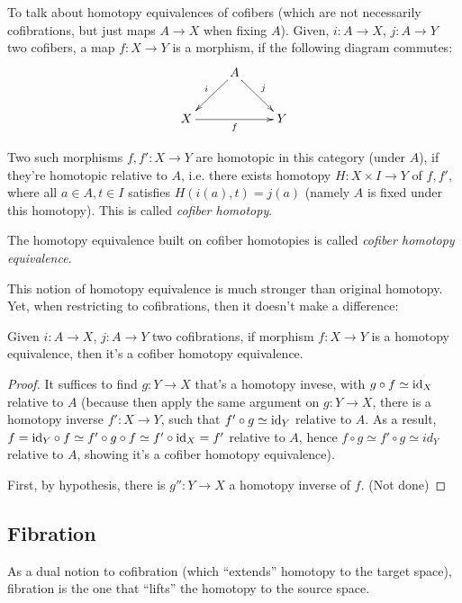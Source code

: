 \documentclass{article}
\begin{document}
\hfil

To talk about homotopy equivalences of cofibers (which are not necessarily cofibrations, but just maps $A\rightarrow X$ when fixing $A$). Given, $i:A\rightarrow X$, $j:A\rightarrow Y$ two cofibers, a map $f:X\rightarrow Y$ is a morphism, if the following diagram commutes:
\[\xymatrix{
    & A \ar[dl]_-{i} \ar[dr]^-{j}\\
    X \ar[rr]_-{f} && Y
}\]

\begin{defn}
    Two such morphisms $f,f':X\rightarrow Y$ are homotopic in this category (under $A$), if they're homotopic relative to $A$, i.e. there exists homotopy $H:X\times I\rightarrow Y$ of $f,f'$, where all $a\in A, t\in I$ satisfies $H(i(a),t)=j(a)$ (namely $A$ is fixed under this homotopy). This is called \emph{cofiber homotopy}.

    The homotopy equivalence built on cofiber homotopies is called \emph{cofiber homotopy equivalence}.
\end{defn}

This notion of homotopy equivalence is much stronger than original homotopy. Yet, when restricting to cofibrations, then it doesn't make a difference:
\begin{prop}
    Given $i:A\rightarrow X$, $j:A\rightarrow Y$ two cofibrations, if morphism $f:X\rightarrow Y$ is a homotopy equivalence, then it's a cofiber homotopy equivalence.
\end{prop}

\begin{proof}
    It suffices to find $g:Y\rightarrow X$ that's a homotopy invese, with $g\circ f\simeq \mathrm{id}_X$ relative to $A$ (because then apply the same argument on $g:Y \rightarrow X$, there is a homotopy inverse $f':X\rightarrow Y$, such that $f'\circ g\simeq \mathrm{id}_Y$ relative to $A$. As a result, $f = \mathrm{id}_Y \circ f\simeq f'\circ g\circ f\simeq f'\circ \mathrm{id}_X = f'$ relative to $A$, hence $f\circ g\simeq f'\circ g\simeq id_Y$ relative to $A$, showing it's a cofiber homotopy equivalence).

    First, by hypothesis, there is $g'':Y\rightarrow X$ a homotopy inverse of $f$. (Not done)
\end{proof}

\newpage

\subsection{Fibration}

As a dual notion to cofibration (which ``extends'' homotopy to the target space), fibration is the one that ``lifts'' the homotopy to the source space. 
\end{document}
